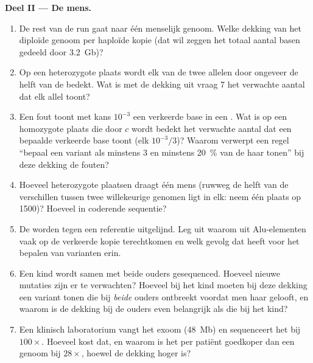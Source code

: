 \begin{problem}
\medskip
\noindent\textbf{Deel II --- De mens.}
\begin{enumerate}[resume]
  \item De rest van de run gaat naar één menselijk genoom. Welke
        dekking van het diploïde genoom per haploïde kopie (dat wil
        zeggen het totaal aantal basen gedeeld door \qty{3.2}{Gb})?
  \item Op een heterozygote plaats wordt elk van de twee allelen door
        ongeveer de helft van de  bedekt. Wat is met de dekking uit
        vraag 7 het verwachte aantal  dat elk allel toont?
  \item Een fout toont met kans $10^{-3}$ een verkeerde base in een
        . Wat is op een homozygote plaats die door $c$  wordt
        bedekt het verwachte aantal  dat een bepaalde verkeerde
        base toont (elk $10^{-3}/3$)? Waarom verwerpt een regel ``bepaal
        een variant als minstens $3$  en minstens \qty{20}{\%} van
        de  haar tonen'' bij deze dekking de fouten?
  \item Hoeveel heterozygote plaatsen draagt één mens (ruwweg de helft
        van de verschillen tussen twee willekeurige genomen ligt in
        elk: neem één plaats op \num{1500})? Hoeveel in coderende
        sequentie?
  \item De  worden tegen een referentie uitgelijnd. Leg uit waarom
         uit Alu-elementen vaak op de verkeerde kopie terechtkomen
        en welk gevolg dat heeft voor het bepalen van varianten erin.
  \item Een kind wordt samen met beide ouders gesequenced. Hoeveel
        nieuwe mutaties zijn er te verwachten? Hoeveel  bij het
        kind moeten bij deze dekking een variant tonen die bij
        \emph{beide} ouders ontbreekt voordat men haar gelooft, en
        waarom is de dekking bij de ouders even belangrijk als die bij
        het kind?
  \item Een klinisch laboratorium vangt het exoom (\qty{48}{Mb}) en
        sequenceert het bij $100\times$. Hoeveel  kost dat, en
        waarom is het per patiënt goedkoper dan een genoom bij
        $28\times$, hoewel de dekking hoger is?
\end{enumerate}


\end{problem}
